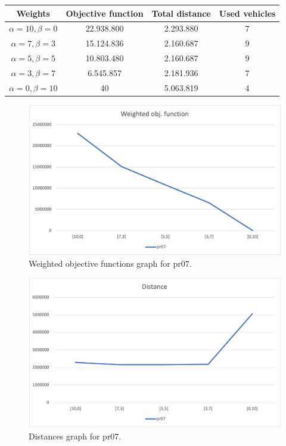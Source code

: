 {
\renewcommand{\arraystretch}{2}
\begin{longtable}[h]{| c | c | c | c |}
    \hline
    \textbf{Weights} & \textbf{Objective function} & \textbf{Total distance} & \textbf{Used vehicles} \\
    \hline
    \endhead
    $\alpha = 10, \beta = 0$ & 22.938.800 & 2.293.880 & 7 \\
    \hline
    $\alpha = 7, \beta = 3$  & 15.124.836 & 2.160.687 & 9 \\
    \hline
    $\alpha = 5, \beta = 5$  & 10.803.480 & 2.160.687 & 9 \\
    \hline
    $\alpha = 3, \beta = 7$  &  6.545.857 & 2.181.936 & 7 \\
    \hline
    $\alpha = 0, \beta = 10$ &         40 & 5.063.819 & 4 \\
    \hline
\end{longtable}
}
\begin{figure}[H]
    \centering
    \includegraphics[width=1.0\columnwidth]{../graphs/pr07-wobjf.png}
    \caption{Weighted objective functions graph for pr07.}
\end{figure}

\begin{figure}[H]
    \centering
    \includegraphics[width=1.0\columnwidth]{../graphs/pr07-distance.png}
    \caption{Distances graph for pr07.}
\end{figure}

